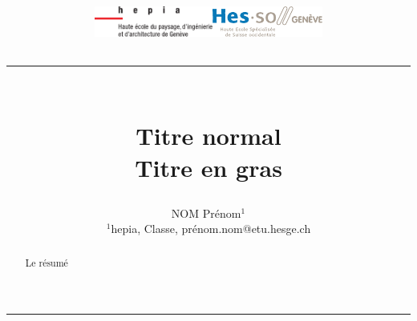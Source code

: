 
\begin{titlepage}
\title{\vspace{-12.73mm}
\includegraphics[height=10mm]{Pdg/logo_hepia.pdf}\hfill \includegraphics[height=10mm]{Pdg/logo_hes-so.pdf}\\%
    \centering\rule{17cm}{0.1mm}\vspace*{0.4in}\\
   Titre normal \\
   \textbf{Titre en gras}}
\author{NOM Prénom$^1$
        \vspace*{0.2in}\\
        \small$^1$hepia, Classe, prénom.nom@etu.hesge.ch}

\maketitle
\begin{center}
\rule{17cm}{0.1mm}
\end{center}
\begin{abstract}
        Le résumé
\end{abstract}
\end{titlepage}